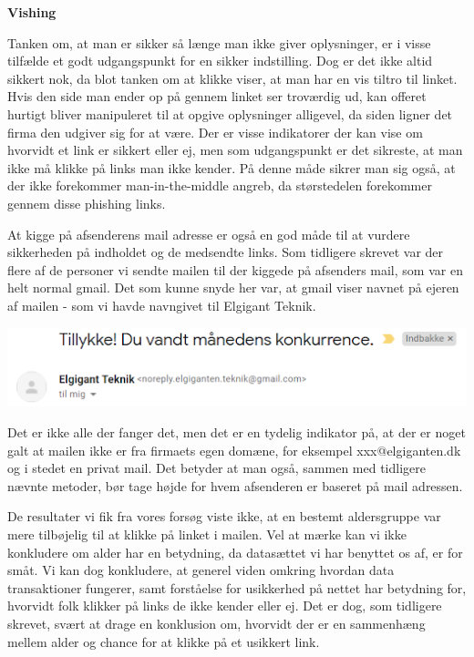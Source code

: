 \documentclass[11pt]{report}
\begin{document}
\noindent\textbf{Vishing}
\par Tanken om, at man er sikker så længe man ikke giver oplysninger, er i visse tilfælde et godt udgangspunkt for en sikker indstilling. Dog er det ikke altid sikkert nok, da blot tanken om at klikke viser, at man har en vis tiltro til linket. Hvis den side man ender op på gennem linket ser troværdig ud, kan offeret hurtigt bliver manipuleret til at opgive oplysninger alligevel, da siden ligner det firma den udgiver sig for at være. Der er visse indikatorer der kan vise om hvorvidt et link er sikkert eller ej, men som udgangspunkt er det sikreste, at man ikke må klikke på links man ikke kender. På denne måde sikrer man sig også, at der ikke forekommer man-in-the-middle angreb, da størstedelen forekommer gennem disse phishing links.

At kigge på afsenderens mail adresse er også en god måde til at vurdere sikkerheden på indholdet og de medsendte links. Som tidligere skrevet var der flere af de personer vi sendte mailen til der kiggede på afsenders mail, som var en helt normal gmail. Det som kunne snyde her var, at gmail viser navnet på ejeren af mailen - som vi havde navngivet til Elgigant Teknik. 
\begin{center}
\includegraphics[height=2.3cm, width=17cm]{emailTitle}
\end{center}

Det er ikke alle der fanger det, men det er en tydelig indikator på, at der er noget galt at mailen ikke er fra firmaets egen domæne, for eksempel xxx@elgiganten.dk og i stedet en privat mail. Det betyder at man også, sammen med tidligere nævnte metoder, bør tage højde for hvem afsenderen er baseret på mail adressen.

De resultater vi fik fra vores forsøg viste ikke, at en bestemt aldersgruppe var mere tilbøjelig til at klikke på linket i mailen. Vel at mærke kan vi ikke konkludere om alder har en betydning, da datasættet vi har benyttet os af, er for småt. Vi kan dog konkludere, at generel viden omkring hvordan data transaktioner fungerer, samt forståelse for usikkerhed på nettet har betydning for, hvorvidt folk klikker på links de ikke kender eller ej. Det er dog, som tidligere skrevet, svært at drage en konklusion om, hvorvidt der er en sammenhæng mellem alder og chance for at klikke på et usikkert link.
\end{document}
